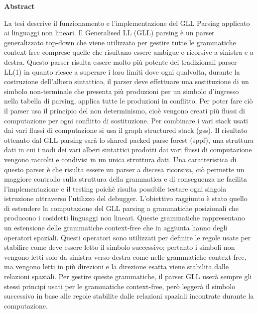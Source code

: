 \documentclass[12pt]{article}
\begin{document}
	\begin{center}
		{\huge\bf Abstract}\par
	\end{center}
	La tesi descrive il funzionamento e l'implementazione del GLL Parsing applicato ai linguaggi non lineari. Il Generalised LL (GLL) parsing è un parser generalizzato top-down che viene utilizzato per gestire tutte le grammatiche context-free comprese quelle che risultano essere ambigue e ricorsive a sinistra e a destra. Questo parser risulta essere molto più potente dei tradizionali parser LL(1) in quanto riesce a superare i loro limiti dove ogni qualvolta, durante la costruzione dell'albero sintattico, il parser deve effettuare una sostituzione di un simbolo non-terminale che presenta più produzioni per un simbolo d'ingresso nella tabella di parsing, applica tutte le produzioni in conflitto. Per poter fare ciò il parser usa il principio del non determinismo, cioè vengono creati più flussi di computazione per ogni conflitto di sostituzione. Per combinare i vari stack usati dai vari flussi di computazione si usa il graph structured stack (gss). Il risultato ottenuto dal GLL parsing sarà lo shared packed parse forest (sppf), una struttura dati in cui i nodi dei vari alberi sintattici prodotti dai vari flussi di computazione vengono raccolti e condivisi in un unica struttura dati. Una caratteristica di questo parser è che risulta essere un parser a discesa ricorsiva, ciò permette un maggiore controllo sulla struttura della grammatica e di conseguenza ne facilita l'implementazione e il testing poichè risulta possibile testare ogni singola istruzione attraverso l'utilizzo del debugger. L'obiettivo raggiunto è stato quello di estendere la computazione del GLL parsing a grammatiche posizionali che producono i cosidetti linguaggi non lineari. Queste grammatiche rappresentano un estensione delle grammatiche context-free che in aggiunta hanno degli operatori spaziali. Questi operatori sono utilizzati per definire le regole usate per stabilire come deve essere letto il simbolo successivo; pertanto i simboli non vengono letti solo da sinistra verso destra come nelle grammatiche context-free, ma vengono letti in più direzioni e la direzione esatta viene stabilita dalle relazioni spaziali. Per gestire queste grammatiche, il parser GLL userà sempre gli stessi principi usati per le grammatiche context-free, però leggerà il simbolo successivo in base alle regole stabilite dalle relazioni spaziali incontrate durante la computazione.
\end{document}
